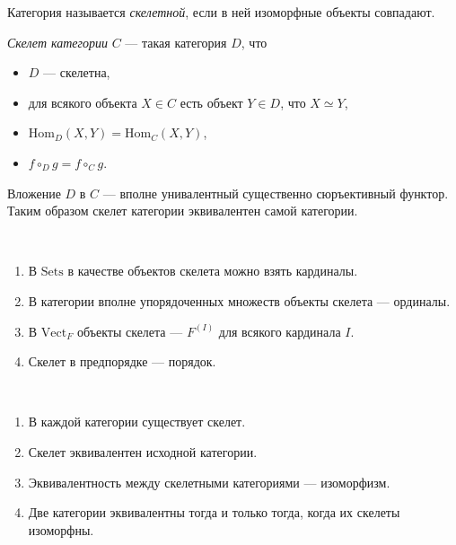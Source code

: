 \documentclass[12pt,a4paper]{article}
\newcommand{\Hom}{\mathrm{Hom}}
\newcommand{\Sets}{\mathrm{Sets}}
\newcommand{\Vect}{\mathrm{Vect}}
\begin{document}
    \begin{definition}
        Категория называется \emph{скелетной}, если в ней изоморфные объекты совпадают.

        \emph{Скелет категории} $C$ --- такая категория $D$, что
        \begin{itemize}
            \item $D$ --- скелетна,
            \item для всякого объекта $X \in C$ есть объект $Y \in D$, что $X \simeq Y$,
            \item $\Hom_D(X, Y) = \Hom_C(X, Y)$,
            \item $f \circ_D g = f \circ_C g$.
        \end{itemize}
    \end{definition}

    \begin{remark}
        Вложение $D$ в $C$ --- вполне унивалентный существенно сюръективный функтор. Таким образом скелет категории эквивалентен самой категории.
    \end{remark}

    \begin{example}\ 
        \begin{enumerate}
            \item В $\Sets$ в качестве объектов скелета можно взять кардиналы.
            \item В категории вполне упорядоченных множеств объекты скелета --- ординалы.
            \item В $\Vect_F$ объекты скелета --- $F^{(I)}$ для всякого кардинала $I$.
            \item Скелет в предпорядке --- порядок.
        \end{enumerate}
    \end{example}

    \begin{lemma}\ 
        \begin{enumerate}
            \item В каждой категории существует скелет.
            \item Скелет эквивалентен исходной категории.
            \item Эквивалентность между скелетными категориями --- изоморфизм.
            \item Две категории эквивалентны тогда и только тогда, когда их скелеты изоморфны.
        \end{enumerate}
    \end{lemma}
\end{document}
